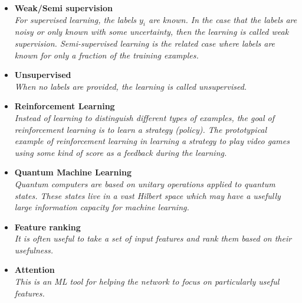 \documentclass[12pt,letterpaper]{article}
\begin{document}
\begin{itemize}
\begin{itemize}
\begin{itemize}
				\item \textbf{Weak/Semi supervision}~\cite{Dery:2017fap,Metodiev:2017vrx,Komiske:2018oaa,Collins:2018epr,Collins:2019jip,Borisyak:2019vbz,Cohen:2017exh,Komiske:2018vkc,Metodiev:2018ftz,collaboration2020dijet,Amram:2020ykb,Brewer:2020och,Dahbi:2020zjw,Lee:2019ssx,Lieberman:2021krq,Komiske:2022vxg,Li:2022omf,LeBlanc:2022bwd}
				\\\textit{For supervised learning, the labels $y_i$ are known.  In the case that the labels are noisy or only known with some uncertainty, then the learning is called weak supervision.  Semi-supervised learning is the related case where labels are known for only a fraction of the training examples.}
				\item \textbf{Unsupervised}~\cite{Mackey:2015hwa,Komiske:2019fks,1797846,Dillon:2019cqt,Cai:2020vzx,Howard:2021pos,Dillon:2021gag}
				\\\textit{When no labels are provided, the learning is called unsupervised.}
				\item \textbf{Reinforcement Learning}~\cite{Carrazza:2019efs,Brehmer:2020brs,John:2020sak,Harvey:2021oue,Cranmer:2021gdt,Windisch:2021mem,Dersy:2022bym}
				\\\textit{Instead of learning to distinguish different types of examples, the goal of reinforcement learning is to learn a strategy (policy).  The prototypical example of reinforcement learning in learning a strategy to play video games using some kind of score as a feedback during the learning.}
				\item \textbf{Quantum Machine Learning}~\cite{Mott:2017xdb,Zlokapa:2019lvv,Blance:2020nhl,Terashi:2020wfi,Chen:2020zkj,Wu:2020cye,Guan:2020bdl,Chen:2021ouz,Blance:2021gcs,Heredge:2021vww,Wu:2021xsj,Belis:2021zqi,Araz:2021ifk,Bravo-Prieto:2021ehz,Kim:2021wrr,Ngairangbam:2021yma,Gianelle:2022unu,Abel:2022lqr,Araz:2022haf,Delgado:2022aty,Alvi:2022fkk,Peixoto:2022zzk,Araz:2022zxk}
				\\\textit{Quantum computers are based on unitary operations applied to quantum states.  These states live in a vast Hilbert space which may have a usefully large information capacity for machine learning.}
				\item \textbf{Feature ranking}~\cite{Faucett:2020vbu,Grojean:2020ech}
				\\\textit{It is often useful to take a set of input features and rank them based on their usefulness.}
				\item \textbf{Attention}~\cite{goto2021development}
				\\\textit{This is an ML tool for helping the network to focus on particularly useful features.}

\end{itemize}
\end{itemize}
\end{itemize}
\end{document}
